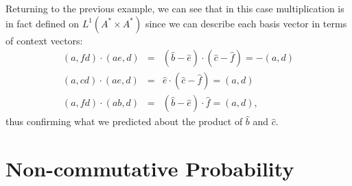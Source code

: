 
Returning to the previous example, we can see that in this case multiplication is in fact defined on $L^1(A^*\times A^*)$ since we can describe each basis vector in terms of context vectors:
\begin{eqnarray*}
(a,fd)\cdot(ae,d) &=& (\hat{b} - \hat{e})\cdot(\hat{c} - \hat{f}) = -(a,d)\\
(a,cd)\cdot(ae,d) &=& \hat{e}\cdot(\hat{c} - \hat{f}) = (a,d)\\
(a,fd)\cdot(ab,d) &=& (\hat{b} - \hat{e})\cdot\hat{f} = (a,d),
\end{eqnarray*}
thus confirming what we predicted about the product of $\hat{b}$ and $\hat{c}$.

\section{Non-commutative Probability}

